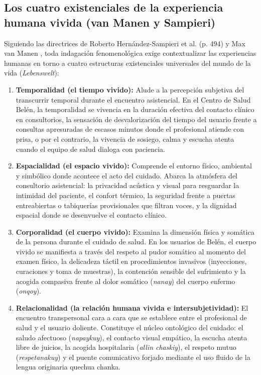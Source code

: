 \subsection{Los cuatro existenciales de la experiencia humana vivida (van Manen y Sampieri)}
\label{sec:4.2_existenciales}
Siguiendo las directrices de Roberto Hernández-Sampieri et al. \cite{sampieri2018} (p. 494) y Max van Manen \cite{vanmanen1990}, toda indagación fenomenológica exige contextualizar las experiencias humanas en torno a cuatro estructuras existenciales universales del mundo de la vida (\textit{Lebenswelt}):

\begin{enumerate}
    \item \textbf{Temporalidad (el tiempo vivido):} Alude a la percepción subjetiva del transcurrir temporal durante el encuentro asistencial. En el Centro de Salud Belén, la temporalidad se vivencia en la duración efectiva del contacto clínico en consultorios, la sensación de desvalorización del tiempo del usuario frente a consultas apresuradas de escasos minutos donde el profesional atiende con prisa, o por el contrario, la vivencia de sosiego, calma y escucha atenta cuando el equipo de salud dialoga con paciencia.
    \item \textbf{Espacialidad (el espacio vivido):} Comprende el entorno físico, ambiental y simbólico donde acontece el acto del cuidado. Abarca la atmósfera del consultorio asistencial: la privacidad acústica y visual para resguardar la intimidad del paciente, el confort térmico, la seguridad frente a puertas entreabiertas o tabiquerías provisionales que filtran voces, y la dignidad espacial donde se desenvuelve el contacto clínico.
    \item \textbf{Corporalidad (el cuerpo vivido):} Examina la dimensión física y somática de la persona durante el cuidado de salud. En los usuarios de Belén, el cuerpo vivido se manifiesta a través del respeto al pudor somático al momento del examen físico, la delicadeza táctil en procedimientos invasivos (inyecciones, curaciones y toma de muestras), la contención sensible del sufrimiento y la acogida compasiva frente al dolor somático (\textit{nanay}) del cuerpo enfermo (\textit{onqoy}).
    \item \textbf{Relacionalidad (la relación humana vivida e intersubjetividad):} El encuentro transpersonal cara a cara que se establece entre el profesional de salud y el usuario doliente. Constituye el núcleo ontológico del cuidado: el saludo afectuoso (\textit{napaykuy}), el contacto visual empático, la escucha atenta libre de juicios, la acogida hospitalaria (\textit{allin chaskiy}), el respeto mutuo (\textit{respetanakuy}) y el puente comunicativo forjado mediante el uso fluido de la lengua originaria quechua chanka.
\end{enumerate}

